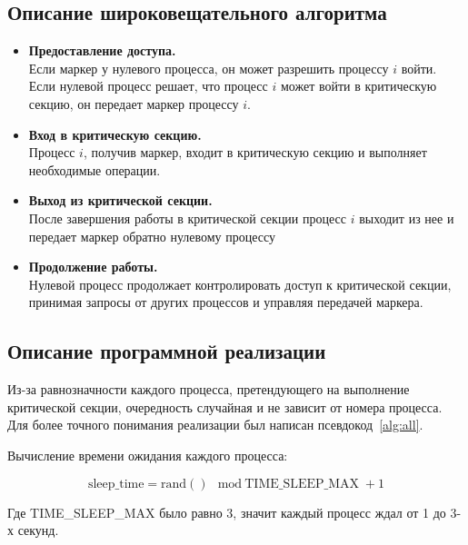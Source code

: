 \documentclass[openany, twoside, a4paper, 12pt]{extbook}
\begin{document}
	\subsection*{Описание широковещательного алгоритма}
	\begin{itemize}
	
		\item{\textbf{Предоставление доступа.}\\}
			Если маркер у нулевого процесса, он может разрешить процессу $ i $ войти.
			Если нулевой процесс решает, что процесс $ i $ может войти в критическую секцию,
			он передает маркер процессу $ i $.
	
		\item{\textbf{Вход в критическую секцию.}\\}
			Процесс $ i $, получив маркер, входит в критическую секцию и выполняет необходимые операции.

		\item{\textbf{Выход из критической секции.}\\}
			После завершения работы в критической секции процесс $ i $ выходит из нее
			и передает маркер обратно нулевому процессу 
	
		\item{\textbf{Продолжение работы.}\\}
			Нулевой процесс продолжает контролировать доступ к критической секции,
			принимая запросы от других процессов и управляя передачей маркера.
	\end{itemize}
	\subsection*{Описание программной реализации}
	Из-за равнозначности каждого процесса, претендующего на выполнение критической секции,
	очередность случайная и не зависит от номера процесса. Для более точного понимания 
	реализации был написан псевдокод~\ref{alg:all}.
	
	Вычисление времени ожидания каждого процесса:
	
	\begin{equation}
		\label{eq:sleep}
		\text{sleep\_time} = \text{rand}() \mod \text{TIME\_SLEEP\_MAX} + 1
	\end{equation}

	Где TIME\_SLEEP\_MAX было равно 3, значит каждый процесс ждал от 1 до 3-х секунд.
\end{document}
